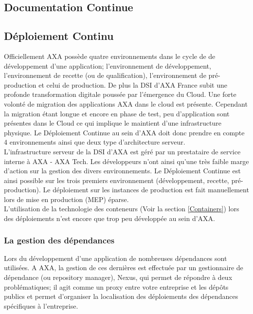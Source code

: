     \subsection{Documentation Continue}

    \subsection{Déploiement Continu}
    Officiellement AXA possède quatre environnements dans le cycle de de développement d'une application; l'environnement de développement, l'environnement de recette (ou de qualification), l'environnement de pré-production et celui de production. De plus la DSI d'AXA France subit une profonde transformation digitale poussée par l'émergence du Cloud. Une forte volonté de migration des applications AXA dans le cloud est présente. Cependant la migration étant longue et encore en phase de test, peu d'application sont présentes dans le Cloud ce qui implique le maintient d'une infrastructure physique. Le Déploiement Continue au sein d'AXA doit donc prendre en compte 4 environnements ainsi que deux type d'architecture serveur.\\

    L'infrastructure serveur de la DSI d'AXA est géré par un prestataire de service interne à AXA - AXA Tech. Les développeurs n'ont ainsi qu'une très faible marge d'action sur la gestion des divers environnements. Le Déploiement Continue est ainsi possible sur les trois premiers environnement (développement, recette, pré-production). Le déploiement sur les instances de production est fait manuellement lors de mise en production (MEP) éparse.\\

    L'utilisation de la technologie des conteneurs (Voir la section \ref{Containers}) lors des déploiements n'est encore que trop peu développée au sein d'AXA.

      \subsubsection{La gestion des dépendances}
      Lors du développement d'une application de nombreuses dépendances sont utilisées. A AXA, la gestion de ces dernières est effectuée par un gestionnaire de dépendance (ou repository manager), Nexus, qui permet de répondre à deux problématiques; il agit comme un proxy entre votre entreprise et les dépôts publics et permet d'organiser la localisation des déploiements des dépendances spécifiques à l'entreprise.\\

